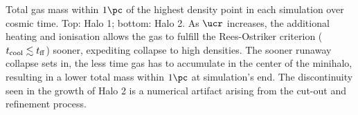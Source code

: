 \label{fig:collapse}
Total gas mass within $1\pc$ of the highest density point in each simulation over cosmic time.
Top: Halo 1; bottom: Halo 2.
As $\ucr$ increases, the additional heating and ionisation allows the gas to fulfill the Rees-Ostriker criterion ($t_{\rm cool} \lesssim t_{\rm ff}$) sooner, expediting collapse to high densities.  
The sooner runaway collapse sets in, the less time gas has to accumulate in the center of the minihalo, resulting in a lower total mass within $1\pc$ at simulation's end.
The discontinuity seen in the growth of Halo 2 is a numerical artifact arising from the cut-out and refinement process.